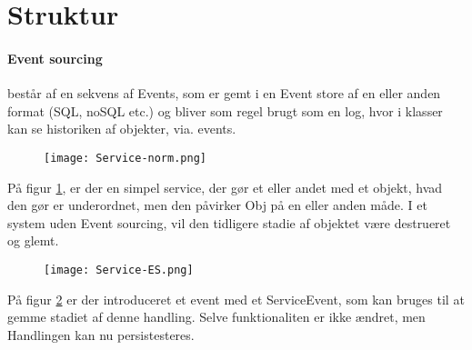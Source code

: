 \section{Struktur}

\paragraph{Event sourcing} består af en sekvens af Events, som er gemt i en Event store af en eller anden format (SQL, noSQL etc.) og bliver som regel brugt som en log, hvor i klasser kan se historiken af objekter, via. events. 

\begin{figure}[H]
    \centering
    \texttt{[image: Service-norm.png]}
    \label{fig:service-model}
\end{figure}

På figur \ref{fig:service-model}, er der en simpel service, der gør et eller andet med et objekt, hvad den gør er underordnet, men den påvirker Obj på en eller anden måde. I et system uden Event sourcing, vil den tidligere stadie af objektet være destrueret og glemt. 

\begin{figure}[H]
    \centering
    \texttt{[image: Service-ES.png]}
    \label{fig:service-ES-model}
\end{figure}

På figur \ref{fig:service-ES-model} er der introduceret et event med et ServiceEvent, som kan bruges til at gemme stadiet af denne handling. Selve funktionaliten er ikke ændret, men Handlingen kan nu persistesteres. 